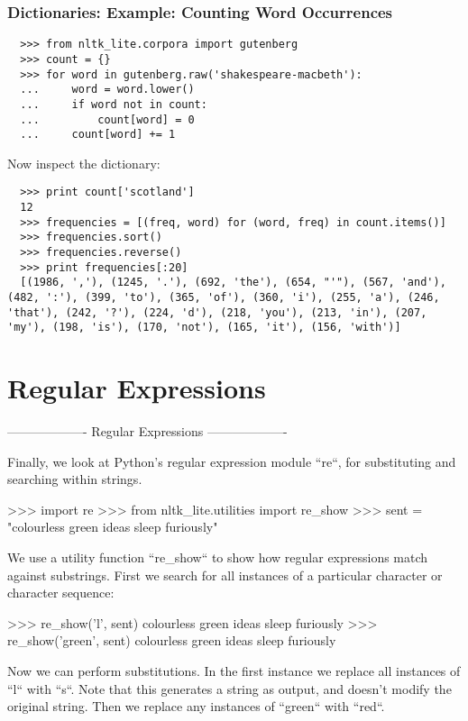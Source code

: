 \documentclass[presentation]{beamer}
\begin{document}
\begin{frame}[fragile]
\frametitle{Dictionaries: Example: Counting Word Occurrences}

\begin{verbatim}
  >>> from nltk_lite.corpora import gutenberg
  >>> count = {}
  >>> for word in gutenberg.raw('shakespeare-macbeth'):
  ...     word = word.lower()
  ...     if word not in count:
  ...         count[word] = 0
  ...     count[word] += 1
\end{verbatim}

Now inspect the dictionary:

\begin{verbatim}
  >>> print count['scotland']
  12
  >>> frequencies = [(freq, word) for (word, freq) in count.items()]
  >>> frequencies.sort()
  >>> frequencies.reverse()
  >>> print frequencies[:20]
  [(1986, ','), (1245, '.'), (692, 'the'), (654, "'"), (567, 'and'), (482, ':'), (399, 'to'), (365, 'of'), (360, 'i'), (255, 'a'), (246, 'that'), (242, '?'), (224, 'd'), (218, 'you'), (213, 'in'), (207, 'my'), (198, 'is'), (170, 'not'), (165, 'it'), (156, 'with')]
\end{verbatim}
\end{frame}

\section{Regular Expressions}

-------------------
Regular Expressions
-------------------

Finally, we look at Python's regular expression module ``re``, for
substituting and searching within strings.

  >>> import re
  >>> from nltk_lite.utilities import re_show
  >>> sent = "colourless green ideas sleep furiously"

We use a utility function ``re_show`` to show how regular expressions
match against substrings.  First we search for all instances of a particular
character or character sequence:

  >>> re_show('l', sent)
  co{l}our{l}ess green ideas s{l}eep furious{l}y
  >>> re_show('green', sent)
  colourless {green} ideas sleep furiously

Now we can perform substitutions.  In the first instance we replace
all instances of ``l`` with ``s``.  Note that this generates a string
as output, and doesn't modify the original string.  Then we replace
any instances of ``green`` with ``red``.
\end{document}
